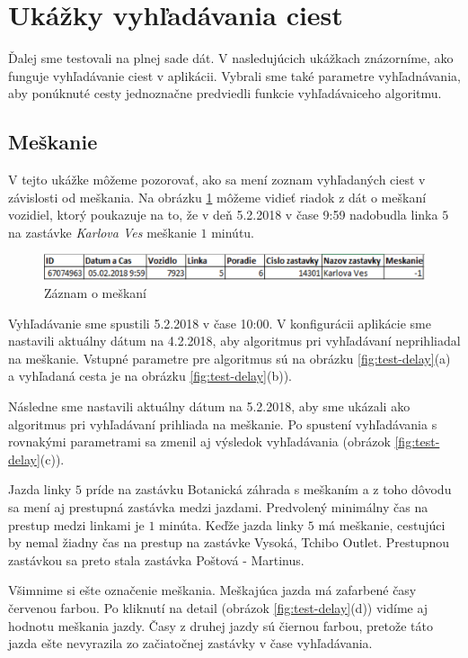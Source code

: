 \section{Ukážky vyhľadávania ciest}
Ďalej sme testovali na plnej sade dát. V nasledujúcich ukážkach znázorníme, ako funguje vyhľadávanie ciest v aplikácii. Vybrali sme také parametre vyhľadnávania, aby ponúknuté cesty jednoznačne predviedli funkcie vyhľadávaiceho algoritmu. 

\subsection{Meškanie}
V tejto ukážke môžeme pozorovať, ako sa mení zoznam vyhľadaných ciest v závislosti od meškania. Na obrázku \ref{fig:delay-row} môžeme vidieť riadok z dát o meškaní vozidiel, ktorý poukazuje na to, že v deň 5.2.2018 v čase 9:59 nadobudla linka $5$ na zastávke \textit{Karlova Ves} meškanie $1$ minútu. 

\begin{figure}[H]
\centerline{\includegraphics[width=1.0\textwidth]{images/delay-row}}
\caption[Záznam o meškaní]{Záznam o meškaní}
\label{fig:delay-row}
\end{figure}

Vyhľadávanie sme spustili 5.2.2018 v čase 10:00. V konfigurácii aplikácie sme nastavili aktuálny dátum na 4.2.2018, aby algoritmus pri vyhľadávaní neprihliadal na meškanie. Vstupné parametre pre algoritmus sú na obrázku \ref{fig:test-delay}(a) a vyhľadaná cesta je na obrázku \ref{fig:test-delay}(b)). 

Následne sme nastavili aktuálny dátum na 5.2.2018, aby sme ukázali ako algoritmus pri vyhľadávaní prihliada na meškanie. Po spustení vyhľadávania s rovnakými parametrami sa zmenil aj výsledok vyhľadávania (obrázok \ref{fig:test-delay}(c)). 

Jazda linky $5$ príde na zastávku Botanická záhrada s meškaním a z toho dôvodu sa mení aj prestupná zastávka medzi jazdami. Predvolený minimálny čas na prestup medzi linkami je $1$ minúta. Keďže jazda linky $5$ má meškanie, cestujúci by nemal žiadny čas na prestup na zastávke Vysoká, Tchibo Outlet. Prestupnou zastávkou sa preto stala zastávka Poštová - Martinus.

Všimnime si ešte označenie meškania. Meškajúca jazda má zafarbené časy červenou farbou. Po kliknutí na detail (obrázok \ref{fig:test-delay}(d)) vidíme aj hodnotu meškania jazdy. Časy z druhej jazdy sú čiernou farbou, pretože táto jazda ešte nevyrazila zo začiatočnej zastávky v čase vyhľadávania. 

